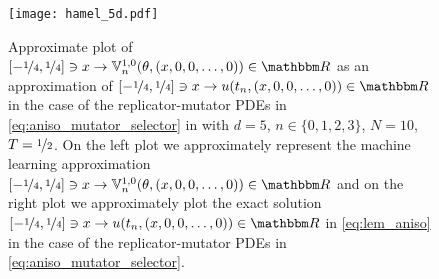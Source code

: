 \begin{figure}
	\centering
	\texttt{[image: hamel\_5d.pdf]}
	\caption{Approximate plot of $[-\nicefrac{1}{4}, \nicefrac{1}{4}] \ni x \to \bV_n^{1,0}(\theta,(x, 0, 0, \dots,0)) \in \R$ as an approximation of $[-\nicefrac{1}{4}, \nicefrac{1}{4}] \ni x \to u(t_n, (x, 0, 0, \dots,0)) \in \R$ in the case of the replicator-mutator PDEs in \eqref{eq:aniso_mutator_selector} in  with $d=5$, $n \in \{ 0, 1, 2, 3 \}$, $N=10$, $T = \nicefrac{1}{2}$. On the left plot we approximately represent the machine learning approximation $[-\nicefrac{1}{4}, \nicefrac{1}{4}] \ni x \to \bV_n^{1,0}(\theta,(x, 0, 0, \dots,0)) \in \R$ and on the right plot we approximately plot the exact solution $[-\nicefrac{1}{4}, \nicefrac{1}{4}] \ni x \to u(t_n, (x, 0, 0, \dots,0)) \in \R$ in \eqref{eq:lem_aniso} in the case of the replicator-mutator PDEs in \eqref{eq:aniso_mutator_selector}.}
	\label{fig:rep_mut}
\end{figure}


